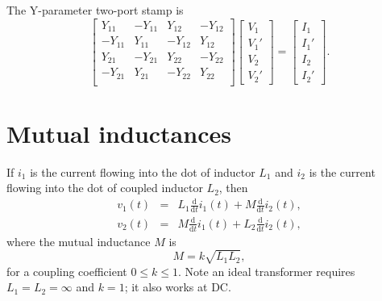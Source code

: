 \documentclass[a4paper, 12pt]{article}
\newcommand{\ud}{\mathrm{d}}
\newcommand{\udby}[1]{\frac{\ud}{\ud #1}}
\newcommand{\mat}[1]{\mathbf{#1}}
\begin{document}
The Y-parameter two-port stamp is
%
\begin{equation}
  \begin{bmatrix}
Y_{11} & -Y_{11} & Y_{12} & -Y_{12} \\
-Y_{11} & Y_{11} & -Y_{12} & Y_{12} \\
Y_{21} & -Y_{21} & Y_{22} & -Y_{22} \\
-Y_{21} & Y_{21} & -Y_{22} & Y_{22} \\
  \end{bmatrix}
  \begin{bmatrix}
    V_1 \\ V_1' \\ V_2 \\ V_2'
  \end{bmatrix}
=
\begin{bmatrix}
  I_1 \\ I_1' \\ I_2 \\ I_2'
\end{bmatrix}.
\end{equation}
%
%



\section{Mutual inductances}


If $i_1$ is the current flowing into the dot of inductor $L_1$ and
$i_2$ is the current flowing into the dot of coupled inductor $L_2$,
%
then
%
\begin{eqnarray}
 v_1(t) & = & L_1 \udby{t} i_1(t) + M \udby{t} i_2(t),\\
 v_2(t) & = & M \udby{t} i_1(t) + L_2 \udby{t} i_2(t),
\label{eqn:mut}
\end{eqnarray}
%
where the mutual inductance $M$ is
%
\begin{equation}
  M = k \sqrt{L_1 L_2},
\end{equation}
%
for a coupling coefficient $0 \le k \le 1$.  Note an ideal transformer
requires $L_1 = L_2 = \infty$ and $k=1$; it also works at DC.
\end{document}
